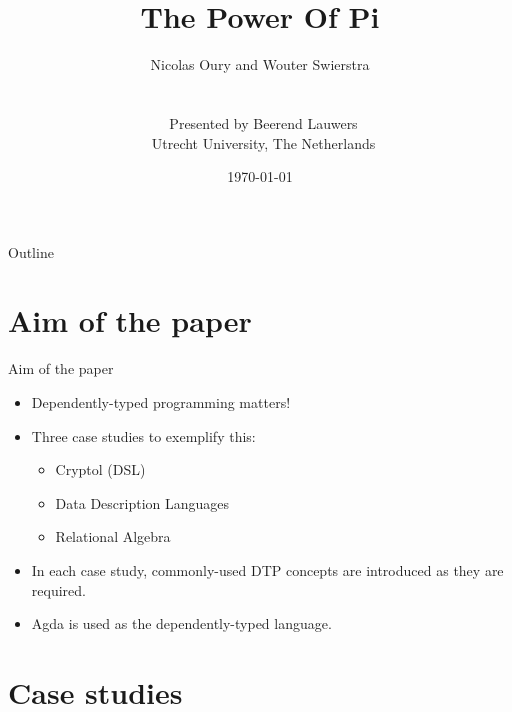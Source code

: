 \documentclass[10pt]{beamer}
\author{
	Nicolas Oury and Wouter Swierstra\\
	\ \\
	\ \\
	\
	Presented by Beerend Lauwers\\
	\
	Utrecht University, The Netherlands
}
\date{\today}
\title{The Power Of Pi}
\begin{document}
\frame{\maketitle}

\begin{frame}{Outline}
\tableofcontents
\end{frame}

\section{Aim of the paper}
\begin{frame}{Aim of the paper}

\begin{itemize}
\item Dependently-typed programming matters!
\item Three case studies to exemplify this:
	\begin{itemize}
	\item Cryptol (DSL)
	\item Data Description Languages
	\item Relational Algebra
	\end{itemize}
\item In each case study, commonly-used DTP concepts are introduced as they are required.
\item Agda is used as the dependently-typed language.
\end{itemize}

\end{frame}

\section{Case studies}
\end{document}
